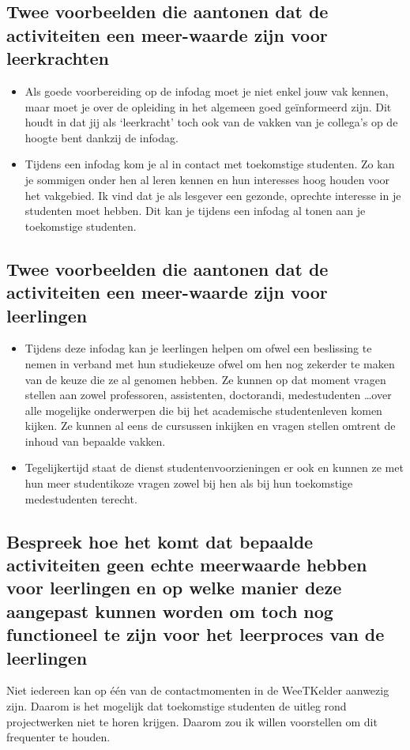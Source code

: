 \documentclass[a4paper,12pt,twoside]{article}%
\begin{document}
	\subsection{Twee voorbeelden die aantonen dat de activiteiten een meer-waarde zijn voor leerkrachten}
	\begin{itemize}
		\item Als goede voorbereiding op de infodag moet je niet enkel jouw vak kennen, maar moet je over de opleiding in het algemeen goed geïnformeerd zijn. Dit houdt in dat jij als `leerkracht' toch ook van de vakken van je collega's op de hoogte bent dankzij de infodag.
		\item Tijdens een infodag kom je al in contact met toekomstige studenten. Zo kan je sommigen onder hen al leren kennen en hun interesses hoog houden voor het vakgebied. Ik vind dat je als lesgever een gezonde, oprechte interesse in je studenten moet hebben. Dit kan je tijdens een infodag al tonen aan je toekomstige studenten.
	\end{itemize}
	
	
	\subsection{Twee voorbeelden die aantonen dat de activiteiten een meer-waarde zijn voor leerlingen}
	\begin{itemize}
		\item Tijdens deze infodag kan je leerlingen helpen om ofwel een beslissing te nemen in verband met hun studiekeuze ofwel om hen nog zekerder te maken van de keuze die ze al genomen hebben. Ze kunnen op dat moment vragen stellen aan zowel professoren, assistenten, doctorandi, medestudenten \ldots over alle mogelijke onderwerpen die bij het academische studentenleven komen kijken. Ze kunnen al eens de cursussen inkijken en vragen stellen omtrent de inhoud van bepaalde vakken.  
		\item Tegelijkertijd staat de dienst studentenvoorzieningen er ook en kunnen ze met hun meer studentikoze vragen zowel bij hen als bij hun toekomstige medestudenten terecht. 
	\end{itemize}
	
	\subsection{Bespreek hoe het komt dat bepaalde activiteiten geen echte meerwaarde hebben voor leerlingen en op welke manier deze aangepast kunnen worden om toch nog functioneel te zijn voor het leerproces van de leerlingen}
	Niet iedereen kan op één van de contactmomenten in de WeeTKelder aanwezig zijn. Daarom is het mogelijk dat toekomstige studenten de uitleg rond projectwerken niet te horen krijgen. Daarom zou ik willen voorstellen om dit frequenter te houden.
	
\end{document}
